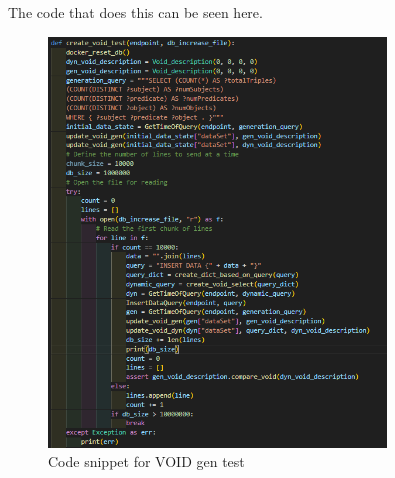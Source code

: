 The code that does this can be seen here.
\begin{figure}[t]
    \centering
    \includegraphics[width=0.8\textwidth]{figures/VOID-gen-test.png}
    \caption{Code snippet for VOID gen test}
    \label{fig:VOID-gen-test}
\end{figure}

